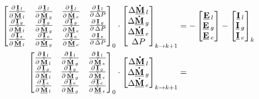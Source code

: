  \begin{align}
 \begin{bmatrix} 
 \DerivParOne{\vec{I}_{l}}{\vec{\dot{M}}_{l}} & \DerivParOne{\vec{I}_{l}}{\vec{\dot{M}}_{g}}  & \DerivParOne{\vec{I}_{l}}{\vec{\dot{M}}_{e}} & \DerivParOne{\vec{I}_{l}}{\Delta P}\\
 \DerivParOne{\vec{I}_{g}}{\vec{\dot{M}}_{l}} & \DerivParOne{\vec{I}_{g}}{\vec{\dot{M}}_{g}}  & \DerivParOne{\vec{I}_{g}}{\vec{\dot{M}}_{e}} & \DerivParOne{\vec{I}_{g}}{\Delta P}\\
 \DerivParOne{\vec{I}_{e}}{\vec{\dot{M}}_{l}} & \DerivParOne{\vec{I}_{e}}{\vec{\dot{M}}_{g}}  & \DerivParOne{\vec{I}_{e}}{\vec{\dot{M}}_{e}} & \DerivParOne{\vec{I}_{e}}{\Delta P}
 \end{bmatrix}_{0}
 \cdot
 \begin{bmatrix}
 \Delta \vec{\dot{M}}_l \\
 \Delta \vec{\dot{M}}_g \\
 \Delta \vec{\dot{M}}_e \\
 \Delta P
 \end{bmatrix}_{k\rightarrow k+1} & =
 -\begin{bmatrix}
 \vec{E}_{l} \\
 \vec{E}_{g} \\
 \vec{E}_{e}
 \end{bmatrix} -
 \begin{bmatrix}
 \vec{I}_{l} \\
 \vec{I}_{g} \\
 \vec{I}_{e}
 \end{bmatrix}_{k} \\ 
 \begin{bmatrix} 
 \DerivParOne{\vec{I}_{l}}{\vec{\dot{M}}_{l}} & \DerivParOne{\vec{I}_{l}}{\vec{\dot{M}}_{g}}  & \DerivParOne{\vec{I}_{l}}{\vec{\dot{M}}_{e}} \\
 \DerivParOne{\vec{I}_{g}}{\vec{\dot{M}}_{l}} & \DerivParOne{\vec{I}_{g}}{\vec{\dot{M}}_{g}}  & \DerivParOne{\vec{I}_{g}}{\vec{\dot{M}}_{e}} \\
 \DerivParOne{\vec{I}_{e}}{\vec{\dot{M}}_{l}} & \DerivParOne{\vec{I}_{e}}{\vec{\dot{M}}_{g}}  & \DerivParOne{\vec{I}_{e}}{\vec{\dot{M}}_{e}}
 \end{bmatrix}_{0}
 \cdot
 \begin{bmatrix}
 \Delta \vec{\dot{M}}_l \\
 \Delta \vec{\dot{M}}_g \\
 \Delta \vec{\dot{M}}_e
 \end{bmatrix}_{k\rightarrow k+1} & =

\end{align}
